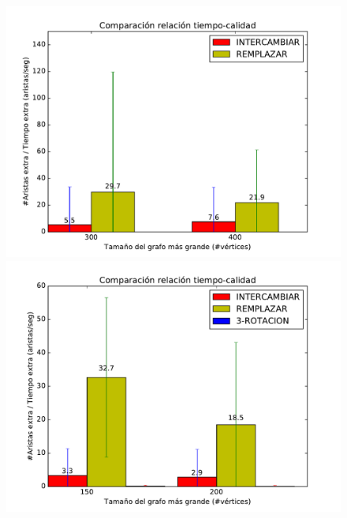 \begin{figure}[H]
\begin{minipage}{0.49\textwidth}
  \centering
    \includegraphics[width=1\textwidth]{graficos/problema_6/cociente0-4.pdf}
  \caption{\footnotesize{}}
  \label{fig:calidad5-3}
\end{minipage}%
\hspace{0.01\textwidth}
\begin{minipage}{0.49\textwidth}   
  \centering
    \includegraphics[width=1\textwidth]{graficos/problema_6/cociente1-2.pdf} 
  \caption{\footnotesize{}}
  \label{fig:calidad5-4}
\end{minipage}
\end{figure}


